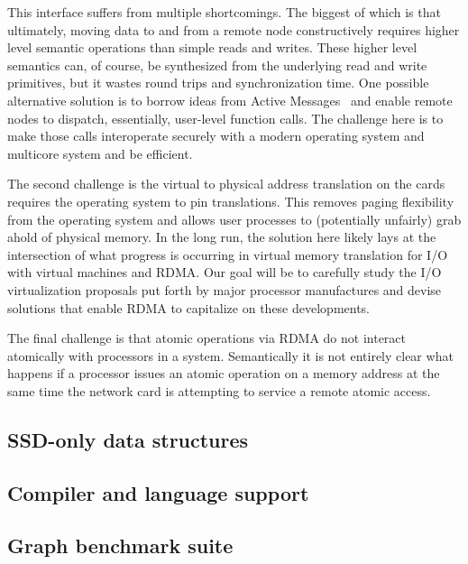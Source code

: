 This interface suffers from multiple shortcomings.  The biggest of which is that ultimately, moving data to and from a remote node constructively requires higher level semantic operations than simple reads and writes.  These higher level semantics can, of course, be synthesized from the underlying read and write primitives, but it wastes round trips and synchronization time.  One possible alternative solution is to borrow ideas from Active Messages~\cite{active-messages} and enable remote nodes to dispatch, essentially, user-level function calls.  The challenge here is to make those calls interoperate securely with a modern operating system and multicore system and be efficient.   

The second challenge is the virtual to physical address translation on the cards requires the operating system to pin translations.  This removes paging flexibility from the operating system and allows user processes to (potentially unfairly) grab ahold of physical memory.  In the long run, the solution here likely lays at the intersection of what progress is occurring in virtual memory translation for I/O with virtual machines and RDMA.  Our goal will be to carefully study the I/O virtualization proposals put forth by major processor manufactures and devise solutions that enable RDMA to capitalize on these developments.  

The final challenge is that atomic operations via RDMA do not interact atomically with processors in a system.  Semantically it is not entirely clear what happens if a processor issues an atomic operation on a memory address at the same time the network card is attempting to service a remote atomic access. 

\subsection{SSD-only data structures}


\subsection{Compiler and language support}

\subsection{Graph benchmark suite}



